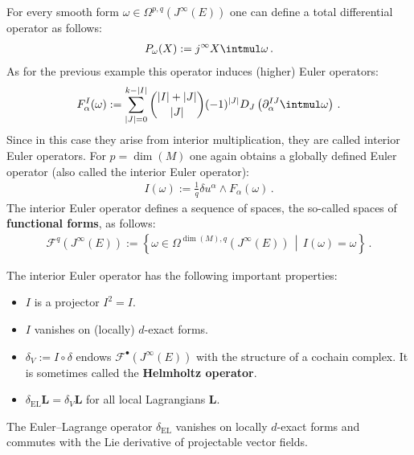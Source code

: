     \begin{example}
        For every smooth form $\omega\in\Omega^{p,q}(J^\infty(E))$ one can define a total differential operator as follows:
        \begin{gather}
            P_\omega(X) := j^\infty X\intmul\omega\,.
        \end{gather}
        As for the previous example this operator induces (higher) Euler operators:
        \begin{gather}
            \label{var:interior_euler_operators}
            F^I_\alpha(\omega) := \sum_{|J|=0}^{k-|I|}\binom{|I|+|J|}{|J|}(-1)^{|J|}D_J\left(\partial^{IJ}_\alpha\intmul\omega\right)\,.
        \end{gather}
        Since in this case they arise from interior multiplication, they are called interior Euler operators. For $p=\dim(M)$ one again obtains a globally defined Euler operator (also called the interior Euler operator):
        \begin{gather}
            I(\omega) := \frac{1}{q}\delta u^\alpha\wedge F_\alpha(\omega)\,.
        \end{gather}
        The interior Euler operator defines a sequence of spaces, the so-called spaces of \textbf{functional forms}, as follows:
        \begin{gather}
            \label{var:functional_complex}
            \mathcal{F}^q(J^\infty(E)) := \left\{\omega\in\Omega^{\dim(M),q}(J^\infty(E))\,\middle\vert\,I(\omega)=\omega\right\}\,.
        \end{gather}
    \end{example}
    \begin{property}\label{var:I_properties}
        The interior Euler operator has the following important properties:
        \begin{itemize}
            \item $I$ is a projector $I^2=I$.
            \item $I$ vanishes on (locally) $d$-exact forms.
            \item $\delta_V := I\circ\delta$ endows $\mathcal{F}^\bullet(J^\infty(E))$ with the structure of a cochain complex. It is sometimes called the \textbf{Helmholtz operator}.
            \item $\delta_{\text{EL}}\mathbf{L} = \delta_V\mathbf{L}$ for all local Lagrangians $\mathbf{L}$.
        \end{itemize}
    \end{property}
    \begin{result}\label{var:EL_operator_properties}
        The Euler--Lagrange operator $\delta_{\text{EL}}$ vanishes on locally $d$-exact forms and commutes with the Lie derivative of projectable vector fields.
    \end{result}

